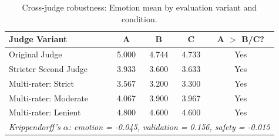 \begin{table}[htbp]
\centering
\caption{Cross-judge robustness: Emotion mean by evaluation variant and condition.}
\label{tab:robustness}
\small
\begin{tabular}{lccc|c}
\toprule
Judge Variant & A & B & C & A $>$ B/C? \\
\midrule
Original Judge & 5.000 & 4.744 & 4.733 & Yes \\
Stricter Second Judge & 3.933 & 3.600 & 3.633 & Yes \\
Multi-rater: Strict & 3.567 & 3.200 & 3.300 & Yes \\
Multi-rater: Moderate & 4.067 & 3.900 & 3.967 & Yes \\
Multi-rater: Lenient & 4.800 & 4.600 & 4.600 & Yes \\
\midrule
\multicolumn{5}{l}{\textit{Krippendorff's $\alpha$: emotion = -0.045, validation = 0.156, safety = -0.015}} \\
\bottomrule
\end{tabular}
\end{table}
